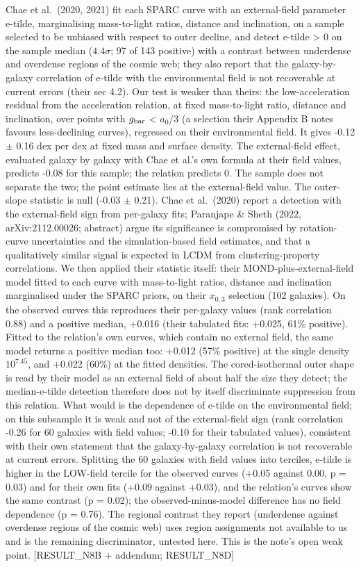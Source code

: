 \documentclass[
  10pt,
]{article}
\begin{document}
Chae et al.~(2020, 2021) fit each SPARC curve with an external-field
parameter e-tilde, marginalising mass-to-light ratios, distance and
inclination, on a sample selected to be unbiased with respect to outer
decline, and detect e-tilde \textgreater{} 0 on the sample median ($4.4\sigma$; 97 of 143 positive) with a contrast between underdense and
overdense regions of the cosmic web; they also report that the
galaxy-by-galaxy correlation of e-tilde with the environmental field is
not recoverable at current errors (their sec 4.2). Our test is weaker
than theirs: the low-acceleration residual from the acceleration
relation, at fixed mass-to-light ratio, distance and inclination, over
points with $g_{\rm bar}$ \textless{} $a_0$/3 (a selection their Appendix B notes
favours less-declining curves), regressed on their environmental field.
It gives -0.12 $\pm$ 0.16 dex per dex at fixed mass and surface density.
The external-field effect, evaluated galaxy by galaxy with Chae et al.'s
own formula at their field values, predicts -0.08 for this sample; the
relation predicts 0. The sample does not separate the two; the point estimate
lies at the external-field value. The outer-slope statistic is null
(-0.03 $\pm$ 0.21). Chae et al.~(2020) report a detection with the
external-field sign from per-galaxy fits; Paranjape \& Sheth (2022,
arXiv:2112.00026; abstract) argue its significance is compromised by
rotation-curve uncertainties and the simulation-based field estimates,
and that a qualitatively similar signal is expected in LCDM from
clustering-property correlations. We then applied their statistic
itself: their MOND-plus-external-field model fitted to each curve with
mass-to-light ratios, distance and inclination marginalised under the
SPARC priors, on their $x_{0,3}$ selection (102 galaxies). On the observed
curves this reproduces their per-galaxy values (rank correlation 0.88)
and a positive median, +0.016 (their tabulated fits: +0.025, 61\%
positive). Fitted to the relation's own curves, which contain no external
field, the same model returns a positive median too: +0.012 (57\%
positive) at the single density $10^{7.45}$, and +0.022 (60\%) at the
fitted densities. The cored-isothermal outer shape is read by their
model as an external field of about half the size they detect; the
median-e-tilde detection therefore does not by itself discriminate
suppression from this relation. What would is the dependence of e-tilde on
the environmental field; on this subsample it is weak and not of the
external-field sign (rank correlation -0.26 for 60 galaxies with field
values; -0.10 for their tabulated values), consistent with their own
statement that the galaxy-by-galaxy correlation is not recoverable at
current errors. Splitting the 60 galaxies with field values into
terciles, e-tilde is higher in the LOW-field tercile for the observed
curves (+0.05 against 0.00, p = 0.03) and for their own fits (+0.09
against +0.03), and the relation's curves show the same contrast (p = 0.02);
the observed-minus-model difference has no field dependence (p = 0.76).
The regional contrast they report (underdense against overdense regions
of the cosmic web) uses region assignments not available to us and is
the remaining discriminator, untested here. This is the note's open weak
point. {[}RESULT\_N8B + addendum; RESULT\_N8D{]}
\end{document}
